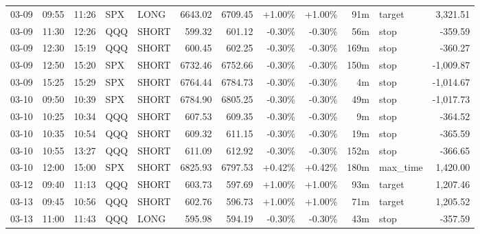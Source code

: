 \documentclass[11pt,a4paper,twoside]{article}
\begin{document}
\begin{center}
\begin{longtable}{>{\color{txtmain}}l l l l l r r r r r >{\color{txtmain}}l r}
03-09 & 09:55 & 11:26 & SPX & LONG & 6643.02 & 6709.45 & \textcolor{wingreen}{+1.00\%} & \textcolor{wingreen}{+1.00\%} & 91m & target & \textcolor{wingreen}{3,321.51} \\
03-09 & 11:30 & 12:26 & QQQ & SHORT & 599.32 & 601.12 & \textcolor{lossred}{-0.30\%} & \textcolor{lossred}{-0.30\%} & 56m & stop & \textcolor{lossred}{-359.59} \\
03-09 & 12:30 & 15:19 & QQQ & SHORT & 600.45 & 602.25 & \textcolor{lossred}{-0.30\%} & \textcolor{lossred}{-0.30\%} & 169m & stop & \textcolor{lossred}{-360.27} \\
03-09 & 12:50 & 15:20 & SPX & SHORT & 6732.46 & 6752.66 & \textcolor{lossred}{-0.30\%} & \textcolor{lossred}{-0.30\%} & 150m & stop & \textcolor{lossred}{-1,009.87} \\
03-09 & 15:25 & 15:29 & SPX & SHORT & 6764.44 & 6784.73 & \textcolor{lossred}{-0.30\%} & \textcolor{lossred}{-0.30\%} & 4m & stop & \textcolor{lossred}{-1,014.67} \\
03-10 & 09:50 & 10:39 & SPX & SHORT & 6784.90 & 6805.25 & \textcolor{lossred}{-0.30\%} & \textcolor{lossred}{-0.30\%} & 49m & stop & \textcolor{lossred}{-1,017.73} \\
03-10 & 10:25 & 10:34 & QQQ & SHORT & 607.53 & 609.35 & \textcolor{lossred}{-0.30\%} & \textcolor{lossred}{-0.30\%} & 9m & stop & \textcolor{lossred}{-364.52} \\
03-10 & 10:35 & 10:54 & QQQ & SHORT & 609.32 & 611.15 & \textcolor{lossred}{-0.30\%} & \textcolor{lossred}{-0.30\%} & 19m & stop & \textcolor{lossred}{-365.59} \\
03-10 & 10:55 & 13:27 & QQQ & SHORT & 611.09 & 612.92 & \textcolor{lossred}{-0.30\%} & \textcolor{lossred}{-0.30\%} & 152m & stop & \textcolor{lossred}{-366.65} \\
03-10 & 12:00 & 15:00 & SPX & SHORT & 6825.93 & 6797.53 & \textcolor{wingreen}{+0.42\%} & \textcolor{wingreen}{+0.42\%} & 180m & max\_time & \textcolor{wingreen}{1,420.00} \\
03-12 & 09:40 & 11:13 & QQQ & SHORT & 603.73 & 597.69 & \textcolor{wingreen}{+1.00\%} & \textcolor{wingreen}{+1.00\%} & 93m & target & \textcolor{wingreen}{1,207.46} \\
03-13 & 09:45 & 10:56 & QQQ & SHORT & 602.76 & 596.73 & \textcolor{wingreen}{+1.00\%} & \textcolor{wingreen}{+1.00\%} & 71m & target & \textcolor{wingreen}{1,205.52} \\
03-13 & 11:00 & 11:43 & QQQ & LONG & 595.98 & 594.19 & \textcolor{lossred}{-0.30\%} & \textcolor{lossred}{-0.30\%} & 43m & stop & \textcolor{lossred}{-357.59} \\
\end{longtable}
\end{center}
\clearpage
\end{document}
